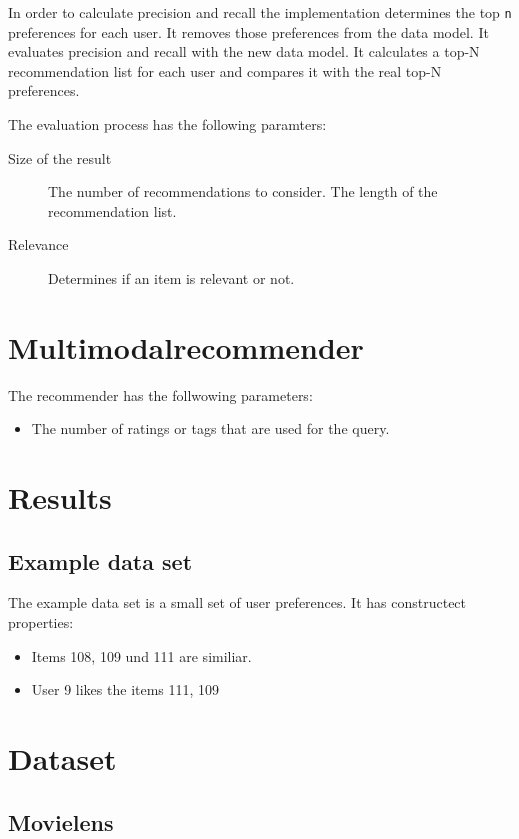 \documentclass[twoside,a4paper]{article}
\begin{document}
In order to calculate precision and recall the implementation determines the top \verb|n| preferences for each user. It removes those preferences from the data model. It evaluates precision and recall with the new data model. It calculates a top-N recommendation list for each user and compares it with the real top-N preferences.

The evaluation process has the following paramters:
\begin{description}
\item[Size of the result] The number of recommendations to consider. The length of the recommendation list.
\item[Relevance] Determines if an item is relevant or not.
\end{description}

\section{Multimodalrecommender}
\label{sec:multimodalrecommender}

The recommender has the follwowing parameters:
\begin{itemize}
\item The number of ratings or tags that are used for the query.
\end{itemize}

\section{Results}
\label{sec:results}


\subsection{Example data set}
\label{sec:exampledataset}

The example data set is a small set of user preferences. It has constructect properties:
\begin{itemize}
\item Items 108, 109 und 111 are similiar.
\item User 9 likes the items 111, 109 

\end{itemize}

\section{Dataset}

\subsection{Movielens}
\label{sec:movielens}
\end{document}
